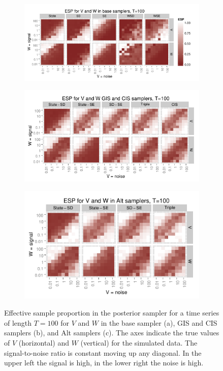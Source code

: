 \documentclass[12pt]{article}
\begin{document}
\begin{figure}[!h]
\centering
\begin{subfigure}[b]{0.59\textwidth}%
\includegraphics[width=\textwidth]{basecisESplot100}
\caption{}
\label{fig:ESPa}
\end{subfigure}
\begin{subfigure}[b]{0.53\textwidth}
\includegraphics[width=\textwidth]{altintESplotV100}
\caption{}
\label{fig:ESPb}
\end{subfigure}
\begin{subfigure}[b]{0.45\textwidth}
\includegraphics[width=\textwidth]{altintESplotW100}
\caption{}
\label{fig:ESPc}
\end{subfigure}
\caption{\small Effective sample proportion in the posterior sampler for a time series of length $T=100$ for $V$ and $W$ in the base sampler (a), GIS and CIS samplers (b), and Alt samplers (c). The axes indicate the true values of $V$ (horizontal) and $W$ (vertical) for the simulated data. The signal-to-noise ratio is constant moving up any diagonal. In the upper left the signal is high, in the lower right the noise is high.}
\label{ESplot}
\end{figure}
\end{document}

